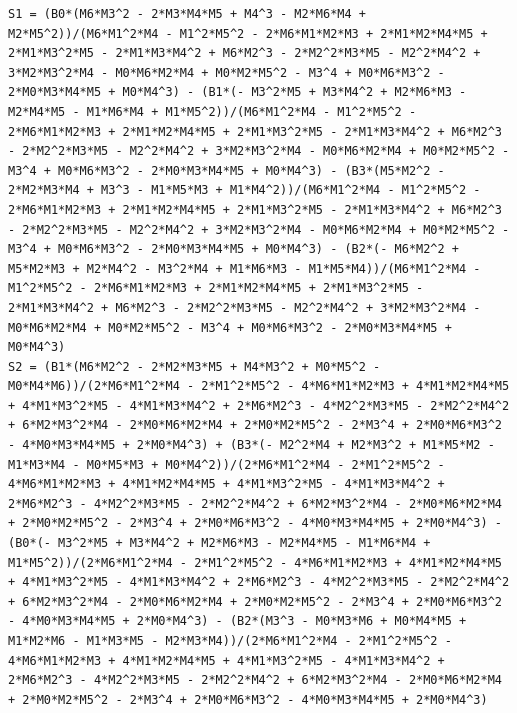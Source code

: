 \documentclass[11pt]{article} %
\begin{document}
\begin{verbatim}
S1 = (B0*(M6*M3^2 - 2*M3*M4*M5 + M4^3 - M2*M6*M4 + M2*M5^2))/(M6*M1^2*M4 - M1^2*M5^2 - 2*M6*M1*M2*M3 + 2*M1*M2*M4*M5 + 2*M1*M3^2*M5 - 2*M1*M3*M4^2 + M6*M2^3 - 2*M2^2*M3*M5 - M2^2*M4^2 + 3*M2*M3^2*M4 - M0*M6*M2*M4 + M0*M2*M5^2 - M3^4 + M0*M6*M3^2 - 2*M0*M3*M4*M5 + M0*M4^3) - (B1*(- M3^2*M5 + M3*M4^2 + M2*M6*M3 - M2*M4*M5 - M1*M6*M4 + M1*M5^2))/(M6*M1^2*M4 - M1^2*M5^2 - 2*M6*M1*M2*M3 + 2*M1*M2*M4*M5 + 2*M1*M3^2*M5 - 2*M1*M3*M4^2 + M6*M2^3 - 2*M2^2*M3*M5 - M2^2*M4^2 + 3*M2*M3^2*M4 - M0*M6*M2*M4 + M0*M2*M5^2 - M3^4 + M0*M6*M3^2 - 2*M0*M3*M4*M5 + M0*M4^3) - (B3*(M5*M2^2 - 2*M2*M3*M4 + M3^3 - M1*M5*M3 + M1*M4^2))/(M6*M1^2*M4 - M1^2*M5^2 - 2*M6*M1*M2*M3 + 2*M1*M2*M4*M5 + 2*M1*M3^2*M5 - 2*M1*M3*M4^2 + M6*M2^3 - 2*M2^2*M3*M5 - M2^2*M4^2 + 3*M2*M3^2*M4 - M0*M6*M2*M4 + M0*M2*M5^2 - M3^4 + M0*M6*M3^2 - 2*M0*M3*M4*M5 + M0*M4^3) - (B2*(- M6*M2^2 + M5*M2*M3 + M2*M4^2 - M3^2*M4 + M1*M6*M3 - M1*M5*M4))/(M6*M1^2*M4 - M1^2*M5^2 - 2*M6*M1*M2*M3 + 2*M1*M2*M4*M5 + 2*M1*M3^2*M5 - 2*M1*M3*M4^2 + M6*M2^3 - 2*M2^2*M3*M5 - M2^2*M4^2 + 3*M2*M3^2*M4 - M0*M6*M2*M4 + M0*M2*M5^2 - M3^4 + M0*M6*M3^2 - 2*M0*M3*M4*M5 + M0*M4^3)
S2 = (B1*(M6*M2^2 - 2*M2*M3*M5 + M4*M3^2 + M0*M5^2 - M0*M4*M6))/(2*M6*M1^2*M4 - 2*M1^2*M5^2 - 4*M6*M1*M2*M3 + 4*M1*M2*M4*M5 + 4*M1*M3^2*M5 - 4*M1*M3*M4^2 + 2*M6*M2^3 - 4*M2^2*M3*M5 - 2*M2^2*M4^2 + 6*M2*M3^2*M4 - 2*M0*M6*M2*M4 + 2*M0*M2*M5^2 - 2*M3^4 + 2*M0*M6*M3^2 - 4*M0*M3*M4*M5 + 2*M0*M4^3) + (B3*(- M2^2*M4 + M2*M3^2 + M1*M5*M2 - M1*M3*M4 - M0*M5*M3 + M0*M4^2))/(2*M6*M1^2*M4 - 2*M1^2*M5^2 - 4*M6*M1*M2*M3 + 4*M1*M2*M4*M5 + 4*M1*M3^2*M5 - 4*M1*M3*M4^2 + 2*M6*M2^3 - 4*M2^2*M3*M5 - 2*M2^2*M4^2 + 6*M2*M3^2*M4 - 2*M0*M6*M2*M4 + 2*M0*M2*M5^2 - 2*M3^4 + 2*M0*M6*M3^2 - 4*M0*M3*M4*M5 + 2*M0*M4^3) - (B0*(- M3^2*M5 + M3*M4^2 + M2*M6*M3 - M2*M4*M5 - M1*M6*M4 + M1*M5^2))/(2*M6*M1^2*M4 - 2*M1^2*M5^2 - 4*M6*M1*M2*M3 + 4*M1*M2*M4*M5 + 4*M1*M3^2*M5 - 4*M1*M3*M4^2 + 2*M6*M2^3 - 4*M2^2*M3*M5 - 2*M2^2*M4^2 + 6*M2*M3^2*M4 - 2*M0*M6*M2*M4 + 2*M0*M2*M5^2 - 2*M3^4 + 2*M0*M6*M3^2 - 4*M0*M3*M4*M5 + 2*M0*M4^3) - (B2*(M3^3 - M0*M3*M6 + M0*M4*M5 + M1*M2*M6 - M1*M3*M5 - M2*M3*M4))/(2*M6*M1^2*M4 - 2*M1^2*M5^2 - 4*M6*M1*M2*M3 + 4*M1*M2*M4*M5 + 4*M1*M3^2*M5 - 4*M1*M3*M4^2 + 2*M6*M2^3 - 4*M2^2*M3*M5 - 2*M2^2*M4^2 + 6*M2*M3^2*M4 - 2*M0*M6*M2*M4 + 2*M0*M2*M5^2 - 2*M3^4 + 2*M0*M6*M3^2 - 4*M0*M3*M4*M5 + 2*M0*M4^3)

\end{verbatim}
\end{document}
